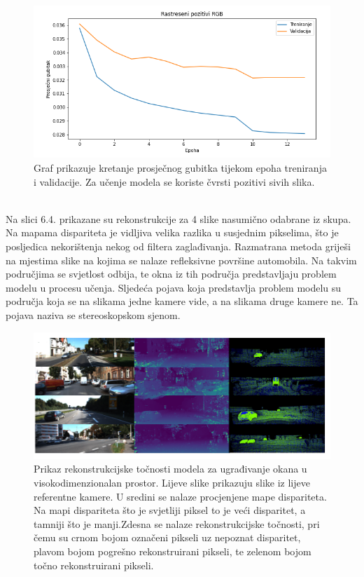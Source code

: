 \documentclass[times, utf8, zavrsni, numeric]{fer}
\begin{document}
\begin{figure}[htb]
\centering
\includegraphics[scale = 0.44]{img/LOOSE_RGB.png}
\caption{Graf prikazuje kretanje prosječnog gubitka tijekom epoha treniranja i validacije. Za učenje modela se koriste čvrsti pozitivi sivih slika.}
\label{fig:KITTI}
\end{figure}
\pagebreak\\
Na slici 6.4. prikazane su rekonstrukcije za 4 slike nasumično odabrane iz skupa. Na mapama dispariteta je vidljiva velika razlika u susjednim pikselima, što je posljedica nekorištenja nekog od filtera zaglađivanja.  Razmatrana metoda griješi na mjestima slike na kojima se nalaze refleksivne površine automobila. Na takvim područjima se svjetlost odbija, te okna iz tih područja predstavljaju problem modelu u procesu učenja. Sljedeća pojava koja predstavlja problem modelu su područja koja se na slikama jedne kamere vide, a na slikama druge kamere ne. Ta pojava naziva se stereoskopskom sjenom.\cite{ilinovic}

\begin{figure}[htb]
\centering
\includegraphics[scale = 0.43]{img/eval.png}
\caption{Prikaz rekonstrukcijske točnosti modela za ugrađivanje okana u visokodimenzionalan prostor. Lijeve slike prikazuju slike iz lijeve referentne kamere. U sredini se nalaze procjenjene mape dispariteta. Na mapi dispariteta što je svjetliji piksel to je veći disparitet, a tamniji što je manji.Zdesna se nalaze rekonstrukcijske točnosti, pri čemu su crnom bojom označeni pikseli uz nepoznat disparitet, plavom bojom pogrešno rekonstruirani pikseli, te zelenom bojom točno rekonstruirani pikseli.}
\label{fig:KITTI}
\end{figure}
\end{document}
